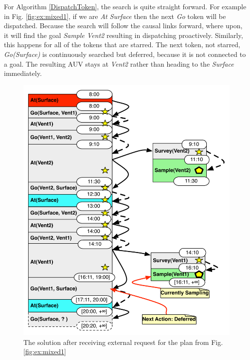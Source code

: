 For Algorithm \ref{DispatchToken}, the search is quite straight
forward. For example in Fig. \ref{fig:ex:mixed1}, if we are {\em At
Surface} then the next {\em Go} token will be dispatched. Because the
search will follow the causal links forward, where upon, it will find
the goal {\em Sample Vent2} resulting in dispatching proactively.
Similarly, this happens for all of the tokens that are starred. The
next token, not starred, {\em Go(Surface)} is continuously searched but deferred,
because it is not connected to a goal. The resulting
AUV stays at {\em Vent2} rather than heading to the {\em Surface}
immediately.


\begin{figure}
  \centering
  \includegraphics[width=0.8\columnwidth]{figs/example_MixedUpdate}
  \caption{\small The solution after receiving external request for
    the plan from Fig. \ref{fig:ex:mixed1}} 
  \label{fig:ex:mixed2}
\end{figure}

